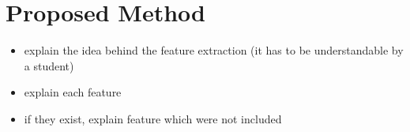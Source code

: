 \chapter{Proposed Method}
\begin{itemize}
  \item explain the idea behind the feature extraction (it has to be understandable by a student)
  \item explain each feature
  \item if they exist, explain feature which were not included
\end{itemize}